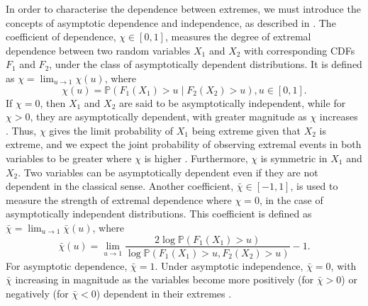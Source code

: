 \documentclass{article}
\numberwithin{equation}{section}
\begin{document}
In order to characterise the dependence between extremes, we must introduce the concepts of asymptotic dependence and independence, as described in \citet{Coles1999}.
The coefficient of dependence, $\chi \in [0, 1]$, measures the degree of extremal dependence between two random variables $X_1$ and $X_2$ with corresponding CDFs $F_1$ and $F_2$, under the class of asymptotically dependent distributions.
It is defined as $\chi = \lim_{u \rightarrow 1}{\chi(u)}$, where
\[
  \chi(u) = \mathbb{P}\left( F_1(X_1) > u \mid F_2(X_2) > u \right), u \in [0, 1].
\]
If $\chi = 0$, then $X_1$ and $X_2$ are said to be asymptotically independent, while for $\chi > 0$, they are asymptotically dependent, with greater magnitude as $\chi$ increases \citep{Coles1999}.
Thus, $\chi$ gives the limit probability of $X_1$ being extreme given that $X_2$ is extreme, and we expect the joint probability of observing extremal events in both variables to be greater where $\chi$ is higher \citep{Rohrbeck2021}.
Furthermore, $\chi$ is symmetric in $X_1$ and $X_2$.
Two variables can be asymptotically dependent even if they are not dependent in the classical sense.
Another coefficient, $\bar{\chi} \in [-1, 1]$, is used to measure the strength of extremal dependence where $\chi = 0$, in the case of asymptotically independent distributions.
This coefficient is defined as $\bar{\chi} = \lim_{u \rightarrow 1}{\bar{\chi}(u)}$, where
\[
  \bar{\chi}(u) = \lim_{u \rightarrow 1} \frac{2\log\mathbb{P}(F_1(X_1) > u)}{ \log{\mathbb{P}(F_1(X_1) > u, F_2(X_2) > u)}} - 1.
\]
For asymptotic dependence, $\bar{\chi} = 1$.
Under asymptotic independence, $\bar{\chi} = 0$, with $\bar{\chi}$ increasing in magnitude as the variables become more positively (for $\bar{\chi} > 0$) or negatively (for $\bar{\chi} < 0$) dependent in their extremes \citep{Vignotto2021}.
\end{document}
